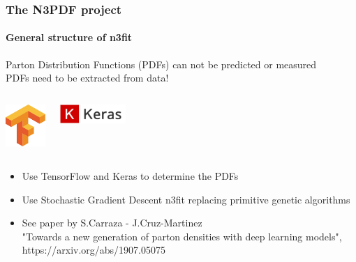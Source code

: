 \documentclass[aspectratio=43]{beamer}
\begin{document}
\begin{frame}
	
	\frametitle{The N3PDF project}
	\framesubtitle{General structure of n3fit}

	\footnotesize Parton Distribution Functions (PDFs) can not be predicted or measured\\
	{\color{red} PDFs need to be extracted from data!}

	\vspace{0.5cm}
	
	\begin{columns}
		
		
		\includegraphics[width = 1.5cm]{plots/section2/TF.png}
				
				
		\includegraphics[width = 2.5cm]{plots/section2/Keras.png}
		
	\end{columns}
	
	\vspace{0.5cm}
	
	\begin{itemize}
		\item \footnotesize Use TensorFlow and Keras to determine the PDFs
		\item \footnotesize Use Stochastic Gradient Descent {\color{violet} n3fit} replacing primitive genetic algorithms
	    \item \footnotesize See paper by S.Carraza - J.Cruz-Martinez \\
		\footnotesize {\color{blue}"Towards a new generation of parton densities with deep learning models",\\ https://arxiv.org/abs/1907.05075}
	\end{itemize}

\end{frame}
\end{document}
